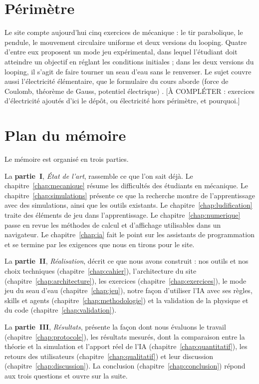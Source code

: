 \section{Périmètre}

Le site compte aujourd'hui cinq exercices de mécanique : le tir parabolique,
le pendule, le mouvement circulaire uniforme et deux versions du looping.
Quatre d'entre eux proposent un mode jeu expérimental, dans lequel
l'étudiant doit atteindre un objectif en réglant les conditions initiales ;
dans les deux versions du looping, il s'agit de faire tourner un seau d'eau
sans le renverser. Le sujet couvre aussi l'électricité élémentaire, que le
formulaire du cours aborde (force de Coulomb, théorème de Gauss, potentiel
électrique) \cite{formulaire_epl1201}. [À COMPLÉTER : exercices d'électricité
ajoutés d'ici le dépôt, ou électricité hors périmètre, et pourquoi.]

\section{Plan du mémoire}

Le mémoire est organisé en trois parties.

La \textbf{partie~I}, \emph{État de l'art}, rassemble ce que l'on sait déjà.
Le chapitre~\ref{chap:mecanique} résume les difficultés des étudiants en
mécanique. Le chapitre~\ref{chap:simulations} présente ce que la recherche
montre de l'apprentissage avec des simulations, ainsi que les outils
existants. Le chapitre~\ref{chap:ludification} traite des éléments de jeu
dans l'apprentissage. Le chapitre~\ref{chap:numerique} passe en revue les
méthodes de calcul et d'affichage utilisables dans un navigateur. Le
chapitre~\ref{chap:ia} fait le point sur les assistants de programmation et
se termine par les exigences que nous en tirons pour le site.

La \textbf{partie~II}, \emph{Réalisation}, décrit ce que nous avons
construit : nos outils et nos choix techniques
(chapitre~\ref{chap:cahier}), l'architecture du site
(chapitre~\ref{chap:architecture}), les exercices
(chapitre~\ref{chap:exercices}), le mode jeu du seau d'eau
(chapitre~\ref{chap:jeu}), notre façon d'utiliser l'IA avec ses règles,
skills et agents (chapitre~\ref{chap:methodologie}) et la validation de la
physique et du code (chapitre~\ref{chap:validation}).

La \textbf{partie~III}, \emph{Résultats}, présente la façon dont nous
évaluons le travail (chapitre~\ref{chap:protocole}), les résultats mesurés,
dont la comparaison entre la théorie et la simulation et l'apport réel de
l'IA (chapitre~\ref{chap:quantitatif}), les retours des utilisateurs
(chapitre~\ref{chap:qualitatif}) et leur discussion
(chapitre~\ref{chap:discussion}). La conclusion
(chapitre~\ref{chap:conclusion}) répond aux trois questions et ouvre sur la
suite.
